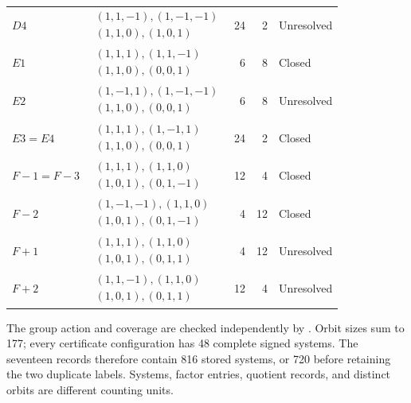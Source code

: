 \documentclass[11pt,letterpaper]{article}
\theoremstyle{definition}\newtheorem{definition}[theorem]{Definition}
\theoremstyle{remark}\newtheorem{remark}[theorem]{Remark}
\begin{document}
\begin{longtable}{l m{2.80in}rrl}
$D4$ & $\begin{gathered}(1,1,-1),(1,-1,-1)\\(1,1,0),(1,0,1)\end{gathered}$ & 24 & 2 & Unresolved \\[3pt]
$E1$ & $\begin{gathered}(1,1,1),(1,1,-1)\\(1,1,0),(0,0,1)\end{gathered}$ & 6 & 8 & Closed \\[3pt]
$E2$ & $\begin{gathered}(1,-1,1),(1,-1,-1)\\(1,1,0),(0,0,1)\end{gathered}$ & 6 & 8 & Unresolved \\[3pt]
$E3=E4$ & $\begin{gathered}(1,1,1),(1,-1,1)\\(1,1,0),(0,0,1)\end{gathered}$ & 24 & 2 & Closed \\[3pt]
$F{-}1=F{-}3$ & $\begin{gathered}(1,1,1),(1,1,0)\\(1,0,1),(0,1,-1)\end{gathered}$ & 12 & 4 & Closed \\[3pt]
$F{-}2$ & $\begin{gathered}(1,-1,-1),(1,1,0)\\(1,0,1),(0,1,-1)\end{gathered}$ & 4 & 12 & Closed \\[3pt]
$F{+}1$ & $\begin{gathered}(1,1,1),(1,1,0)\\(1,0,1),(0,1,1)\end{gathered}$ & 4 & 12 & Unresolved \\[3pt]
$F{+}2$ & $\begin{gathered}(1,1,-1),(1,1,0)\\(1,0,1),(0,1,1)\end{gathered}$ & 12 & 4 & Unresolved \\[3pt]
\bottomrule
\end{longtable}

The group action and coverage are checked independently by . Orbit sizes sum to 177; every certificate configuration has 48 complete signed systems. The seventeen records therefore contain 816 stored systems, or 720 before retaining the two duplicate labels. Systems, factor entries, quotient records, and distinct orbits are different counting units.
\end{document}

